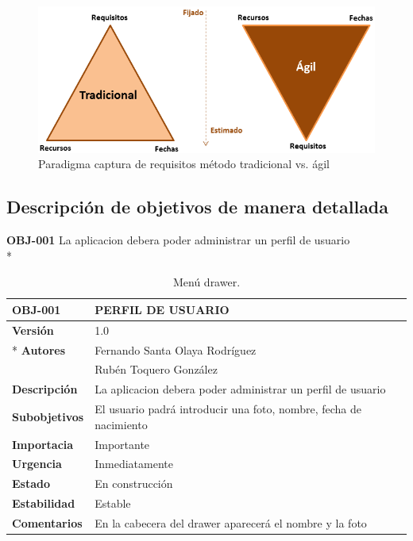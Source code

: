 \documentclass[../pfc.tex]{subfiles}
\begin{document}
	\begin{figure}
		\centering
		\includegraphics[width=0.5\linewidth]{../images/paradigmaRequisitos}
		\caption{Paradigma captura de requisitos método tradicional vs. ágil}
		\label{fig:paradigmaRequisitos}
	\end{figure}
			
			
	\subsection{Descripción de objetivos de manera detallada}
	
	
	\textbf{OBJ-001}	La aplicacion debera poder administrar un perfil de usuario\\*
	
		\begin{table}[H]
			\centering
			\begin{tabular}[t]{|l|l|}
				\hline \textbf{OBJ-001} & \textbf{PERFIL DE USUARIO} \\*
				\hline\hline \textbf{Versión} & 1.0 \\ *
				\hline\textbf{Autores} 	& Fernando Santa Olaya Rodríguez \\*
				& Rubén Toquero González\\*
				\hline \textbf{Descripción} & La aplicacion debera poder administrar un perfil de usuario\\* 
				\hline \textbf{Subobjetivos} & El usuario padrá introducir una foto, nombre, fecha de nacimiento \\* 
				\hline \textbf{Importacia} & Importante \\* 			
				\hline \textbf{Urgencia} & Inmediatamente \\* 
				\hline \textbf{Estado} & En construcción \\* 
				\hline \textbf{Estabilidad} & Estable \\* 
				\hline \textbf{Comentarios} & En la cabecera del drawer aparecerá el nombre y la foto \\* 
				\hline 
			\end{tabular}
			\caption{Menú drawer.}
			\label{tabla:req001}
		\end{table}
	
\end{document}
